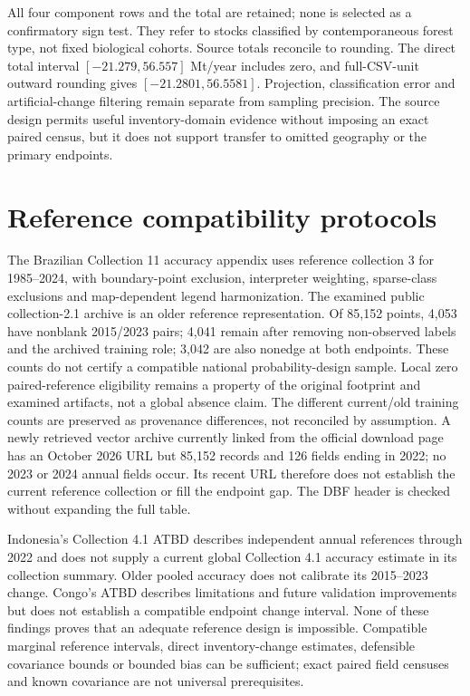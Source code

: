 All four component rows and the total are retained; none is selected as a confirmatory sign test. They refer to stocks classified by contemporaneous forest type, not fixed biological cohorts. Source totals reconcile to rounding. The direct total interval $[-21.279,56.557]$ Mt/year includes zero, and full-CSV-unit outward rounding gives $[-21.2801,56.5581]$. Projection, classification error and artificial-change filtering remain separate from sampling precision. The source design permits useful inventory-domain evidence without imposing an exact paired census, but it does not support transfer to omitted geography or the primary endpoints.

\section{Reference compatibility protocols}
The Brazilian Collection 11 accuracy appendix uses reference collection 3 for 1985--2024, with boundary-point exclusion, interpreter weighting, sparse-class exclusions and map-dependent legend harmonization. The examined public collection-2.1 archive is an older reference representation. Of 85,152 points, 4,053 have nonblank 2015/2023 pairs; 4,041 remain after removing non-observed labels and the archived training role; 3,042 are also nonedge at both endpoints. These counts do not certify a compatible national probability-design sample. Local zero paired-reference eligibility remains a property of the original footprint and examined artifacts, not a global absence claim. The different current/old training counts are preserved as provenance differences, not reconciled by assumption. A newly retrieved vector archive currently linked from the official download page has an October 2026 URL but 85,152 records and 126 fields ending in 2022; no 2023 or 2024 annual fields occur. Its recent URL therefore does not establish the current reference collection or fill the endpoint gap. The DBF header is checked without expanding the full table.

Indonesia's Collection 4.1 ATBD describes independent annual references through 2022 and does not supply a current global Collection 4.1 accuracy estimate in its collection summary. Older pooled accuracy does not calibrate its 2015--2023 change. Congo's ATBD describes limitations and future validation improvements but does not establish a compatible endpoint change interval. None of these findings proves that an adequate reference design is impossible. Compatible marginal reference intervals, direct inventory-change estimates, defensible covariance bounds or bounded bias can be sufficient; exact paired field censuses and known covariance are not universal prerequisites.

